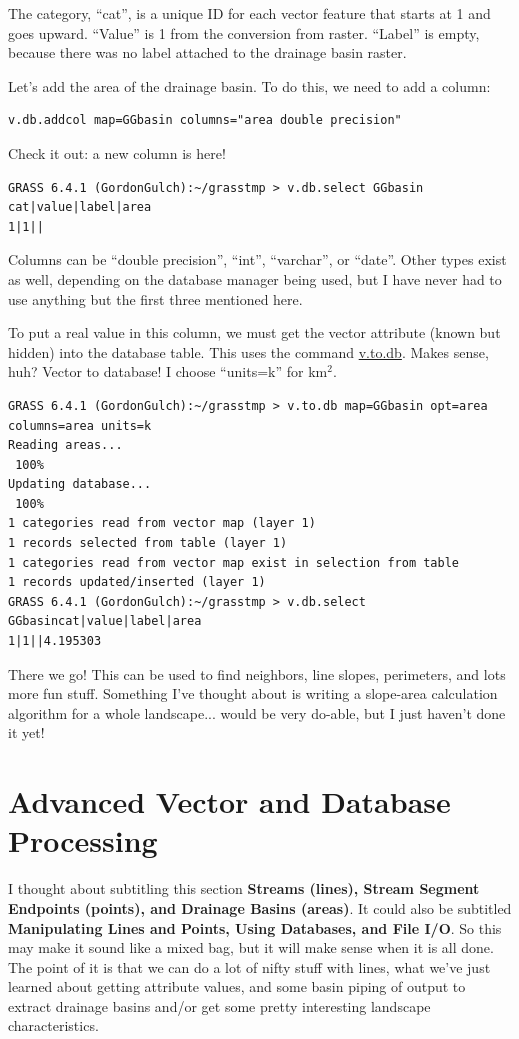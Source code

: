 \documentclass{book}
\begin{document}
The category, ``cat'', is a unique ID for each vector feature that starts at 1 and goes upward. ``Value'' is 1 from the conversion from raster. ``Label'' is empty, because there was no label attached to the drainage basin raster.

Let's add the area of the drainage basin. To do this, we need to add a column:

\begin{lstlisting}
v.db.addcol map=GGbasin columns="area double precision"
\end{lstlisting}

Check it out: a new column is here!

\begin{lstlisting}
GRASS 6.4.1 (GordonGulch):~/grasstmp > v.db.select GGbasin
cat|value|label|area
1|1||
\end{lstlisting}

Columns can be ``double precision'', ``int'', ``varchar'', or ``date''. Other types exist as well, depending on the database manager being used, but I have never had to use anything but the first three mentioned here.

To put a real value in this column, we must get the vector attribute (known but hidden) into the database table. This uses the command \url{v.to.db}. Makes sense, huh? Vector to database! I choose ``units=k'' for km$^2$.

\begin{lstlisting}
GRASS 6.4.1 (GordonGulch):~/grasstmp > v.to.db map=GGbasin opt=area columns=area units=k
Reading areas...
 100%
Updating database...
 100%
1 categories read from vector map (layer 1)
1 records selected from table (layer 1)
1 categories read from vector map exist in selection from table
1 records updated/inserted (layer 1)
GRASS 6.4.1 (GordonGulch):~/grasstmp > v.db.select GGbasincat|value|label|area
1|1||4.195303
\end{lstlisting}

There we go! This can be used to find neighbors, line slopes, perimeters, and lots more fun stuff. Something I've thought about is writing a slope-area calculation algorithm for a whole landscape... would be very do-able, but I just haven't done it yet!

\section{Advanced Vector and Database Processing}

I thought about subtitling this section \textbf{Streams (lines), Stream Segment Endpoints (points), and Drainage Basins (areas)}. It could also be subtitled \textbf{Manipulating Lines and Points, Using Databases, and File I/O}. So this may make it sound like a mixed bag, but it will make sense when it is all done. The point of it is that we can do a lot of nifty stuff with lines, what we've just learned about getting attribute values, and some basin piping of output to extract drainage basins and/or get some pretty interesting landscape characteristics.
\end{document}
